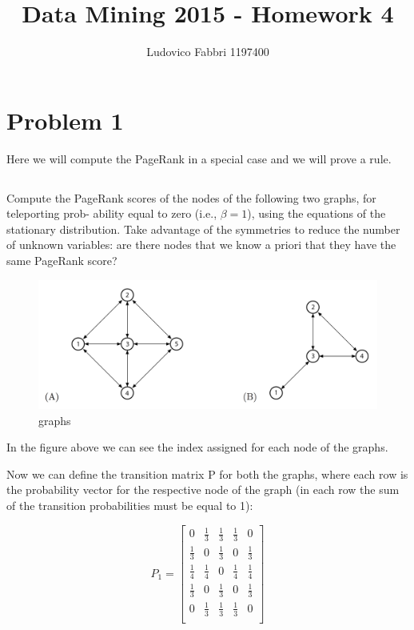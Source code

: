 \documentclass{article}
\begin{document}
\raggedright

\doublespacing


\title{ {\Huge{Data Mining 2015 - Homework 4}} }
\author {Ludovico Fabbri 1197400}
\maketitle


\section{Problem 1}
Here we will compute the PageRank in a special case and we will prove a rule.

\subsection{}
Compute the PageRank scores of the nodes of the following two graphs, for teleporting prob- ability equal to zero (i.e., $\beta = 1$), using the equations of the stationary distribution. Take advantage of the symmetries to reduce the number of unknown variables: are there nodes that we know a priori that they have the same PageRank score?

\newpage

\begin{figure} [h]
\centering
\includegraphics[width=120mm]{graphs}
\caption{graphs  \label{graphs}}
\end{figure}

In the figure above we can see the index assigned for each node of the graphs.


Now we can define the transition matrix P for both the graphs, where each row is the probability vector for the respective node of the graph (in each row the sum of the transition probabilities must be equal to 1):

\begin{equation} \label{eq:matriceTransizione1}
P_{1} =
\begin{bmatrix}
    0 & \frac{1}{3} & \frac{1}{3} &	\frac{1}{3}	& 0  \\
    \frac{1}{3} & 0 & \frac{1}{3} &	0 & \frac{1}{3}	 \\
   \frac{1}{4} & \frac{1}{4} & 0 &	\frac{1}{4}	& \frac{1}{4}  \\
       \frac{1}{3} & 0 & \frac{1}{3} &	0 & \frac{1}{3}	 \\
        0 & \frac{1}{3} & \frac{1}{3} &	\frac{1}{3}	& 0  \\
\end{bmatrix}
\end{equation}
\end{document}
